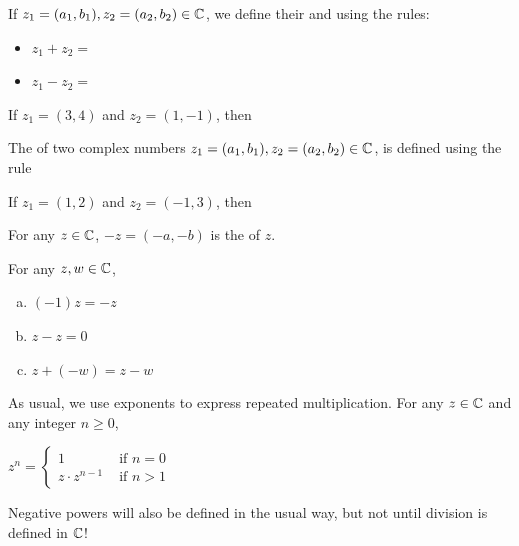 \documentclass[11pt,fleqn,dvipsnames,usenames]{article}
\begin{document}
\begin{definition}
If $z_{1} = (a_{1},b_{1}), z_{2} = (a_{2},b_{2})\in\mathbb{C}$, we define their  and  using the rules:
\begin{itemize}
\item $z_{1} + z_{2} =$
\vsmsp

\item $z_{1} - z_{2} =$
\end{itemize}
\end{definition}

\begin{example}
If $z_{1} = (3,4)$ and $z_{2} = (1,-1)$, then
\end{example}
\vspace{3cm}

\begin{definition}\label{complexmultiplication}
The  of two complex numbers $z_{1} = (a_{1},b_{1}), z_{2} = (a_{2},b_{2})\in\mathbb{C}$, is defined using the rule
\vspace{2cm}
\end{definition}

\begin{example}\label{examplecomplexmultiplication}
If $z_{1} = (1,2)$ and $z_{2} = (-1,3)$, then
\end{example}
\vspace{3cm}

\notation For any $z\in\mathbb{C}$, $-z = (-a,-b)$ is the  of $z$.
\vsp

\properties For any $z,w\in\mathbb{C}$,
\begin{enumerate}[(a)]
\item $(-1)z = -z$
\item $z - z = 0$
\item $z + (-w) = z - w$
\end{enumerate}
\newpage

\notation As usual, we use exponents to express repeated multiplication.  For any $z\in\mathbb{C}$ and any integer $n\geq 0$,
\begin{center}
$z^{n} = \begin{cases} 1 & \text{ if }n = 0\\z\cdot z^{n-1} &\text{ if }n > 1\end{cases}$
\end{center}

\note Negative powers will also be defined in the usual way, but not until division is defined in $\mathbb{C}$!
\end{document}
